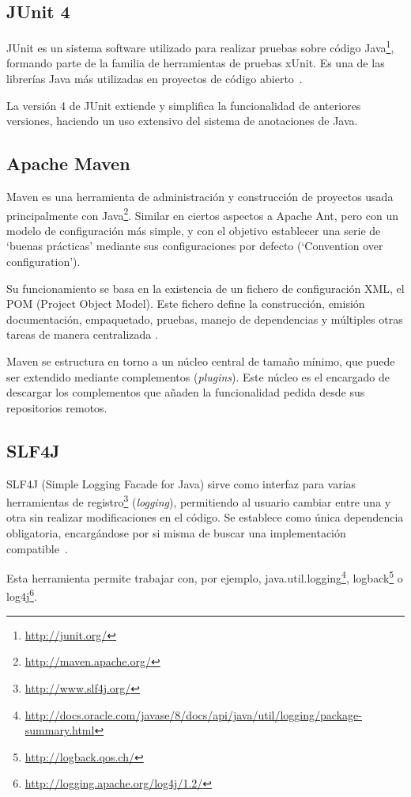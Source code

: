 \subsection{JUnit 4}
JUnit es un sistema software utilizado para realizar pruebas sobre código Java\footnote{\url{http://junit.org/}}, formando parte de la familia de herramientas de pruebas xUnit.
Es una de las librerías Java más utilizadas en proyectos de código abierto~\cite{website:githubTOP}.

La versión 4 de JUnit extiende y simplifica la funcionalidad de anteriores versiones, haciendo un uso extensivo del sistema de anotaciones de Java.

\subsection{Apache Maven}
Maven es una herramienta de administración y construcción de proyectos usada principalmente con Java\footnote{\url{http://maven.apache.org/}}.
Similar en ciertos aspectos a Apache Ant, pero con un modelo de configuración más simple, y con el objetivo establecer una serie de `buenas prácticas' mediante sus configuraciones por defecto (`Convention over configuration').

Su funcionamiento se basa en la existencia de un fichero de configuración XML, el POM (Project Object Model).
Este fichero define la construcción, emisión documentación, empaquetado, pruebas, manejo de dependencias y múltiples otras tareas de manera centralizada \cite{mvnEx}.

Maven se estructura en torno a un núcleo central de tamaño mínimo, que puede ser extendido mediante complementos (\emph{plugins}).
Este núcleo es el encargado de descargar los complementos que añaden la funcionalidad pedida desde sus repositorios remotos.

\subsection{SLF4J}
SLF4J (Simple Logging Facade for Java) sirve como interfaz para varias herramientas de registro\footnote{\url{http://www.slf4j.org/}} (\emph{logging}), permitiendo al usuario cambiar entre una y otra sin realizar modificaciones en el código.
Se establece como única dependencia obligatoria, encargándose por si misma de buscar una implementación compatible~\cite{website:slf4j}.

Esta herramienta permite trabajar con, por ejemplo, java.util.logging\footnote{\url{http://docs.oracle.com/javase/8/docs/api/java/util/logging/package-summary.html}}, logback\footnote{\url{http://logback.qos.ch/}} o log4j\footnote{\url{http://logging.apache.org/log4j/1.2/}}.

